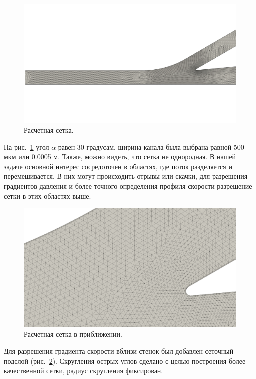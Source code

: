 \documentclass[10pt,a4paper]{book}
\begin{document}
        \begin{figure}[h!]
            \centering
            \includegraphics[width = 1\linewidth]{teslaMesh1}
            \caption{Расчетная сетка.}
            \label{fig:teslaMesh}
        \end{figure}
        
        На рис.~\ref{fig:teslaMesh} угол $\alpha$ равен 30 градусам, ширина канала была выбрана равной 500 мкм или 0.0005 м. Также, можно видеть, что сетка не однородная. В нашей задаче основной интерес сосредоточен в областях, где поток разделяется и перемешивается. В них могут происходить отрывы или скачки, для разрешения градиентов давления и более точного определения профиля скорости разрешение сетки в этих областях выше.
        
        \begin{figure}[H]
            \centering
            \includegraphics[width = 0.7\linewidth]{teslaMesh2}
            \caption{Расчетная сетка в приближении.}
            \label{fig:teslaMesh2}
        \end{figure}   
             
        Для разрешения градиента скорости вблизи стенок был добавлен сеточный подслой (рис.~\ref{fig:teslaMesh2}). Скругления острых углов сделано с целью построения более качественной сетки, радиус скругления фиксирован.
        
\end{document}
